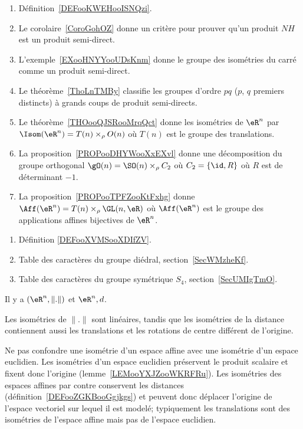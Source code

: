     \begin{enumerate}
        \item
            Définition~\ref{DEFooKWEHooISNQzi}.         %
        \item
            Le corolaire~\ref{CoroGohOZ} donne un critère pour prouver qu'un produit \( NH\) est un produit semi-direct.
        \item
            L'exemple~\ref{EXooHNYYooUDsKnm} donne le groupe des isométries du carré comme un produit semi-direct.
        \item
            Le théorème~\ref{ThoLnTMBy} classifie les groupes d'ordre \( pq\) (\( p\), \( q\) premiers distincts) à grands coups de produit semi-directs.
        \item
            Le théorème~\ref{THOooQJSRooMrqQct} donne les isométries de \( \eR^n\) par \( \Isom(\eR^n)=T(n)\times_{\rho} O(n)\) où \( T(n)\) est le groupe des translations.
        \item
            La proposition~\ref{PROPooDHYWooXxEXvl} donne une décomposition du groupe orthogonal \( \gO(n)=\SO(n)\times_{\rho} C_2\) où \( C_2=\{ \id,R \}\) où \( R\) est de déterminant \( -1\).
        \item
            La proposition~\ref{PROPooTPFZooKtFxhg} donne \( \Aff(\eR^n)=T(n)\times_{\rho}\GL(n,\eR)\) où \( \Aff(\eR^n)\) est le groupe des applications affines bijectives de \( \eR^n\).
        \end{enumerate}


\begin{enumerate}
    \item Définition \ref{DEFooXVMSooXDIfZV}.
    \item Table des caractères du groupe diédral, section~\ref{SecWMzheKf}.
    \item Table des caractères du groupe symétrique \( S_4\), section~\ref{SecUMIgTmO}.
\end{enumerate}


      \label{THMooVUCLooCrdbxm}

Il y a \( (\eR^n,\| . \|)\) et \( \eR^n,d\).

Les isométries de \( \| . \|\) sont linéaires, tandis que les isométries de la distance contiennent aussi les translations et les rotations de centre différent de l'origine.

Ne pas confondre une isométrie d'un espace affine avec une isométrie d'un espace euclidien. Les isométries d'un espace euclidien préservent le produit scalaire et fixent donc l'origine (lemme~\ref{LEMooYXJZooWKRFRu}). Les isométries des espaces affines par contre conservent les distances (définition~\ref{DEFooZGKBooGgjkgs}) et peuvent donc déplacer l'origine de l'espace vectoriel sur lequel il est modelé; typiquement les translations sont des isométries de l'espace affine mais pas de l'espace euclidien.

